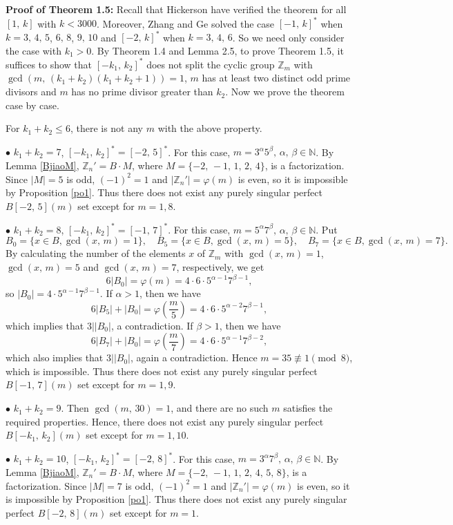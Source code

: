 \documentclass[12pt]{article}
\newtheorem{open problem}{Open problem}[section]
\begin{document}
{\bf Proof of Theorem 1.5:}
Recall that  Hickerson have  verified  the theorem  for all $[1, \, k]$ with  $k < 3000$. Moreover, Zhang and Ge \cite{[ZG]} solved the case $[-1, \,k]^\ast$ when $k=3, \,4, \,5$, $6, \,8$, $9, \,10$ and $[-2, \,k]^\ast$ when $k=3, \,4, \,6$. So we need only consider the case with $k_1>0$.
By Theorem 1.4 and Lemma 2.5, to prove Theorem 1.5, it suffices to  show that $[-k_1, \, k_2]^*$ does not split the cyclic group $\mathbb{Z}_m$ with $\gcd(m, \,(k_1+k_2)(k_1+k_2+1))=1$,  $m$ has at least two distinct odd prime divisors and $m$ has no prime divisor greater than $k_2$. Now we prove the theorem case by case.

For $k_1+k_2\le6$, there is not any $m$ with the above property.

$\bullet$ $k_1+k_2=7$, $[-k_1, \,k_2]^*=[-2, \,5]^*$. For this case, $m=3^\alpha5^\beta, \, \alpha, \, \beta\in\mathbb{N}$. By Lemma \ref{BjiaoM}, $\mathbb{Z}_n'=B\cdot M$, where $M=\{-2, \, -1, \, 1, \, 2,\, 4\}$, is a factorization. Since $|M|=5$ is odd, $(-1)^2=1$ and $|\mathbb{Z}_n'|=\varphi(m)$ is even, so it is impossible by Proposition \ref{po1}. Thus there does not exist any purely singular perfect $B[-2, \,5](m)$ set except for $m=1, 8$.


$\bullet$ $k_1+k_2=8$, $[-k_1, \,k_2]^*=[-1, \,7]^*$. For this case, $m=5^\alpha7^\beta, \, \alpha, \, \beta\in\mathbb{N}$. Put
$$B_0=\{x\in B, \gcd(x, \,m)=1\}, \quad B_5=\{x\in B, \gcd(x, \,m)=5\}, \quad B_7=\{x\in B, \gcd(x, \,m)=7\}.$$
By calculating the number of the elements $x$ of $\mathbb{Z}_m$ with $\gcd(x, \,m)=1$, $\gcd(x, \,m)=5$ and $\gcd(x, \,m)=7$, respectively, we get
$$ 6|B_0|=\varphi(m)=4\cdot6\cdot5^{\alpha-1}7^{\beta-1},$$
so $|B_0|=4\cdot5^{\alpha-1}7^{\beta-1}$. If $\alpha>1$, then we have
$$6|B_5|+|B_0|=\varphi(\frac{m}{5})=4\cdot6\cdot5^{\alpha-2}7^{\beta-1},$$
which implies that $3||B_0|$, a contradiction. If $\beta>1$, then we have
$$6|B_7|+|B_0|=\varphi(\frac{m}{7})=4\cdot6\cdot5^{\alpha-1}7^{\beta-2},$$
which also implies that $3||B_0|$, again a contradiction.  Hence $m=35\not\equiv1\pmod{8}$, which is impossible. Thus there does not exist any purely singular perfect $B[-1, \,7](m)$ set except for $m=1, 9$.


$\bullet$ $k_1+k_2=9$. Then $\gcd(m, \, 30)=1$, and there are no such $m$ satisfies the required properties.
Hence, there does not exist any purely singular perfect $B[-k_1, \,k_2](m)$ set except for $m=1, 10$.

$\bullet$ $k_1+k_2=10$, $[-k_1, \,k_2]^*=[-2, \,8]^*$. For this case, $m=3^\alpha7^\beta, \, \alpha, \, \beta\in\mathbb{N}$. By Lemma \ref{BjiaoM}, $\mathbb{Z}_n'=B\cdot M$, where $M=\{-2, \, -1, \, 1, \, 2,\, 4, \, 5, \,8\}$, is a factorization. Since $|M|=7$ is odd, $(-1)^2=1$ and $|\mathbb{Z}_n'|=\varphi(m)$ is even, so it is impossible by Proposition \ref{po1}. Thus there does not exist any purely singular perfect $B[-2, \,8](m)$ set except for $m=1$.
\end{document}
